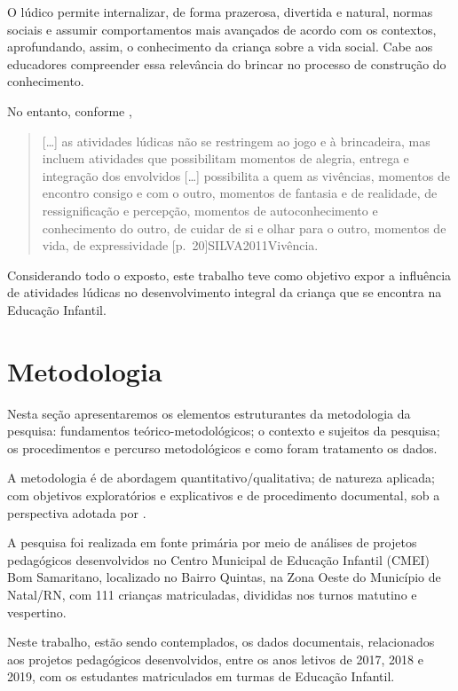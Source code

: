 \begin{refsection}
    O lúdico permite internalizar, de forma prazerosa, divertida e natural, normas sociais e assumir comportamentos mais avançados de acordo com os contextos, aprofundando, assim, o conhecimento da criança sobre a vida social. Cabe aos educadores compreender essa relevância do brincar no processo de construção do conhecimento. 

    No entanto, conforme ,

    \begin{quotation}
        [\dots] as atividades lúdicas não se restringem ao jogo e à brincadeira, mas incluem atividades que possibilitam momentos de alegria, entrega e integração dos envolvidos [\dots] possibilita a quem as vivências, momentos de encontro consigo e com o outro, momentos de fantasia e de realidade, de ressignificação e percepção, momentos de autoconhecimento e conhecimento do outro, de cuidar de si e olhar para o outro, momentos de vida, de expressividade [p.~20]{SILVA2011Vivência}.
    \end{quotation}

    Considerando todo o exposto, este trabalho teve como objetivo expor a influência de atividades lúdicas no desenvolvimento integral da criança que se encontra na Educação Infantil.  


    \section{Metodologia}

    Nesta seção apresentaremos os elementos estruturantes da metodologia da pesquisa: fundamentos teórico-metodológicos; o contexto e sujeitos da pesquisa; os procedimentos e percurso metodológicos e como foram tratamento os dados. 

    A metodologia é de abordagem quantitativo/qualitativa; de natureza aplicada; com objetivos exploratórios e explicativos e de procedimento documental, sob a perspectiva adotada por \textcite{LavilleAndDionne1999Construcao}.  

    A pesquisa foi realizada em fonte primária por meio de análises de projetos pedagógicos desenvolvidos no Centro Municipal de Educação Infantil (CMEI) Bom Samaritano, localizado no Bairro Quintas, na Zona Oeste do Município de Natal/RN, com 111 crianças matriculadas, divididas nos turnos matutino e vespertino. 

    Neste trabalho, estão sendo contemplados, os dados documentais, relacionados aos projetos pedagógicos desenvolvidos, entre os anos letivos de 2017, 2018 e 2019, com os estudantes matriculados em turmas de Educação Infantil.  


\end{refsection}
